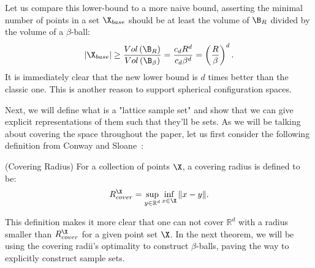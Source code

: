 Let us compare this lower-bound to a more naive bound, asserting the minimal number of points in a set $\X_{base}$ should be at least the volume of $\B_R$ divided by the volume of a $\beta$-ball:
\begin{equation}
        |\X_{base}|\geq \frac{Vol\left(\B_R\right)}{Vol\left(\B_\beta\right)}=\frac{c_d R^d}{c_d\beta^d}=\left(\frac{R}{\beta}\right)^d.
\end{equation}
It is immediately clear that the new lower bound is $d$ times better than the classic one. This is another reason to support spherical configuration spaces.

Next, we will define what is a "lattice sample set" and show that we can give explicit representations of them such that they'll be \decomp sets. As we will be talking about covering the space throughout the paper, let us first consider the following definition from Conway and Sloane~\cite{conway2013sphere}:
\begin{definition} (Covering Radius)
     For a collection of points $\X$, a covering radius is defined to be:
    \[
        R_{cover}^{\X} = \sup_{y\in\mathbb{R}^d}\inf_{x\in\X} \|x-y\|.
    \]
\end{definition}
This definition makes it more clear that one can not cover $\mathbb{R}^d$ with a radius smaller than $R_{cover}^{\X}$ for a given point set $\X$. In the next theorem, we will be using the covering radii's optimality to construct $\beta$-balls, paving the way to explicitly construct \decomp sample sets.
